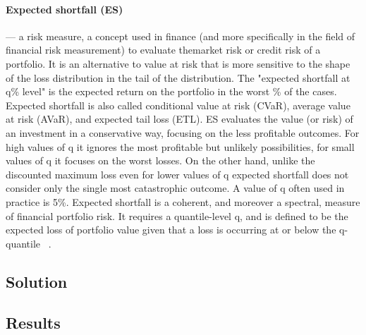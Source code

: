 \paragraph*{Expected shortfall (ES)} --- a risk measure, a concept used in finance (and more specifically in the field of financial risk measurement) to evaluate themarket risk or credit risk of a portfolio. It is an alternative to value at risk that is more sensitive to the shape of the loss distribution in the tail of the distribution. The "expected shortfall at q\% level" is the expected return on the portfolio in the worst  \% of the cases.
    Expected shortfall is also called conditional value at risk (CVaR), average value at risk (AVaR), and expected tail loss (ETL).
ES evaluates the value (or risk) of an investment in a conservative way, focusing on the less profitable outcomes. For high values of q it ignores the most profitable but unlikely possibilities, for small values of q it focuses on the worst losses. On the other hand, unlike the discounted maximum loss even for lower values of q expected shortfall does not consider only the single most catastrophic outcome. A value of q often used in practice is 5\%.
    Expected shortfall is a coherent, and moreover a spectral, measure of financial portfolio risk. It requires a quantile-level  q, and is defined to be the expected loss of portfolio value given that a loss is occurring at or below the  q-quantile ~\cite{Sel10}.


\subsection{Solution}

\subsection{Results}






























